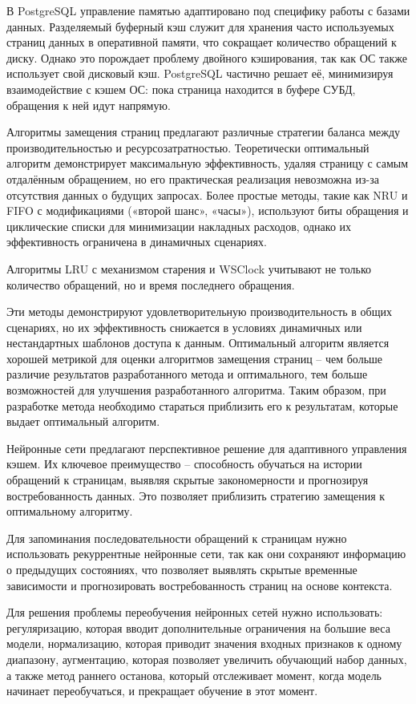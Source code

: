 В PostgreSQL управление памятью адаптировано под специфику работы с базами данных. 
Разделяемый буферный кэш служит для хранения часто используемых страниц данных в оперативной памяти, что сокращает количество обращений к диску.
Однако это порождает проблему двойного кэширования, так как ОС также использует свой дисковый кэш.
PostgreSQL частично решает её, минимизируя взаимодействие с кэшем ОС: пока страница находится в буфере СУБД, обращения к ней идут напрямую.

Алгоритмы замещения страниц предлагают различные стратегии баланса между производительностью и ресурсозатратностью.
Теоретически оптимальный алгоритм демонстрирует максимальную эффективность, удаляя страницу с самым отдалённым обращением, но его практическая реализация невозможна из-за отсутствия данных о будущих запросах. 
Более простые методы, такие как NRU и FIFO с модификациями («второй шанс», «часы»), используют биты обращения и циклические списки для минимизации накладных расходов, однако их эффективность ограничена в динамичных сценариях.

Алгоритмы LRU с механизмом старения и WSClock учитывают не только количество обращений, но и время последнего обращения.

Эти методы демонстрируют удовлетворительную производительность в общих сценариях, но их эффективность снижается в условиях динамичных или нестандартных шаблонов доступа к данным.
Оптимальный алгоритм является хорошей метрикой для оценки алгоритмов замещения страниц -- чем больше различие результатов разработанного метода и оптимального, тем больше возможностей для улучшения разработанного алгоритма.
Таким образом, при разработке метода необходимо стараться приблизить его к результатам, которые выдает оптимальный алгоритм.

Нейронные сети предлагают перспективное решение для адаптивного управления кэшем.
Их ключевое преимущество -- способность обучаться на истории обращений к страницам, выявляя скрытые закономерности и прогнозируя востребованность данных. 
Это позволяет приблизить стратегию замещения к оптимальному алгоритму. 

Для запоминания последовательности обращений к страницам нужно использовать рекуррентные нейронные сети, так как они сохраняют информацию о предыдущих состояниях, что позволяет выявлять скрытые временные зависимости и прогнозировать востребованность страниц на основе контекста.

Для решения проблемы переобучения нейронных сетей нужно использовать: регуляризацию, которая вводит дополнительные ограничения на большие веса модели, нормализацию, которая приводит значения входных признаков к одному диапазону, аугментацию, которая позволяет увеличить обучающий набор данных, а также метод раннего останова, который отслеживает момент, когда модель начинает переобучаться, и прекращает обучение в этот момент.
